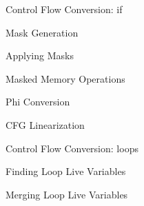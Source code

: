 
\begin{frame}{Control Flow Conversion: if}

\end{frame}


\begin{frame}{Mask Generation}

\end{frame}


\begin{frame}{Applying Masks}

\end{frame}


\begin{frame}{Masked Memory Operations}

\end{frame}


\begin{frame}{Phi Conversion}

\end{frame}


\begin{frame}{CFG Linearization}

\end{frame}


\begin{frame}{Control Flow Conversion: loops}

\end{frame}


\begin{frame}{Finding Loop Live Variables}

\end{frame}


\begin{frame}{Merging Loop Live Variables}

\end{frame}
